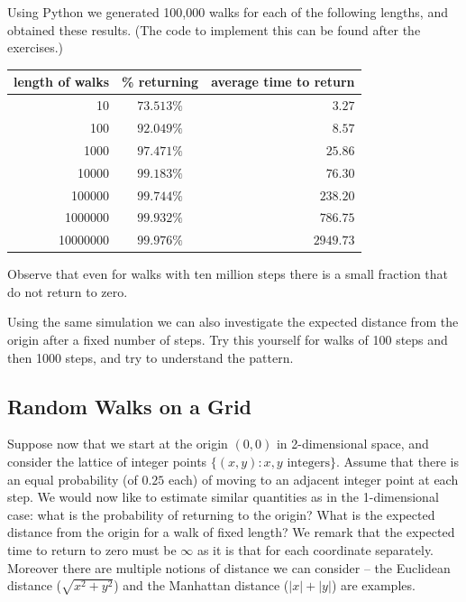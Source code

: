 \newpage

Using Python we generated 100,000 walks for each of the following lengths, and obtained these results. (The code to implement this can be found after the exercises.)

\begin{center}
\begin{tabular}{rcr}
length of walks & \% returning & average time to return\\
\hline
10 & $73.513\%$ & $3.27$ \\
100 & $92.049\%$ & $8.57$ \\
1000 & $97.471\%$ & $25.86$ \\
10000 & $99.183\%$ & $76.30$ \\
100000 & $99.744\%$ & $238.20$ \\
1000000 & $99.932\%$ & $786.75$ \\
10000000 & $99.976\%$ & $2949.73$ \\
\end{tabular}
\end{center}

Observe that even for walks with ten million steps there is a small fraction that do not return to zero.

Using the same simulation we can also investigate the expected distance from the origin after a fixed number of steps.
Try this yourself for walks of 100 steps and then 1000 steps, and try to understand the pattern.



\subsection{Random Walks on a Grid}

Suppose now that we start at the origin $(0,0)$ in 2-dimensional space, and consider the lattice of integer points $\{(x,y) : x,y \text{ integers}\}$.
Assume that there is an equal probability (of $0.25$ each) of moving to an adjacent integer point at each step.
We would now like to estimate similar quantities as in the 1-dimensional case: what is the probability of returning to the origin?
What is the expected distance from the origin for a walk of fixed length?
We remark that the expected time to return to zero must be $\infty$ as it is that for each coordinate separately.
Moreover there are multiple notions of distance we can consider -- the Euclidean distance ($\sqrt{x^2 + y^2}$) and the Manhattan distance ($|x| + |y|$) are examples.

